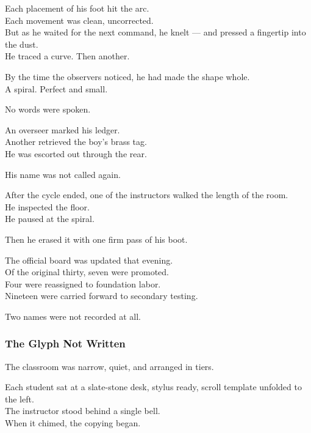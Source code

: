 \documentclass[12pt]{article}
\begin{document}
Each placement of his foot hit the arc.\\
Each movement was clean, uncorrected.\\
But as he waited for the next command, he knelt — and pressed a fingertip into the dust.\\
He traced a curve. Then another.

By the time the observers noticed, he had made the shape whole.\\
A spiral. Perfect and small.

No words were spoken.

An overseer marked his ledger.\\
Another retrieved the boy’s brass tag.\\
He was escorted out through the rear.

His name was not called again.

\vspace{1em}

After the cycle ended, one of the instructors walked the length of the room.\\
He inspected the floor.\\
He paused at the spiral.

Then he erased it with one firm pass of his boot.

\vspace{1em}

The official board was updated that evening.\\
Of the original thirty, seven were promoted.\\
Four were reassigned to foundation labor.\\
Nineteen were carried forward to secondary testing.

Two names were not recorded at all.

\dotfill

\subsubsection*{The Glyph Not Written}

The classroom was narrow, quiet, and arranged in tiers.

Each student sat at a slate-stone desk, stylus ready, scroll template unfolded to the left.\\
The instructor stood behind a single bell.\\
When it chimed, the copying began.

\vspace{1em}
\end{document}
